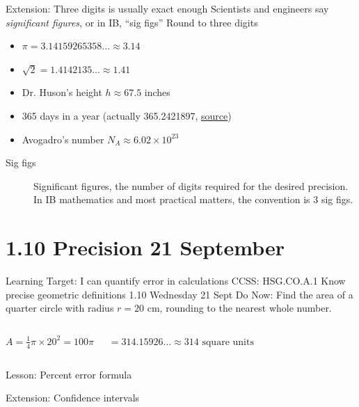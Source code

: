 \begin{frame}{Extension: Three digits is usually exact enough}
    {Scientists and engineers say \emph{significant figures}, or in IB, ``sig figs''}
    Round to three digits
    \begin{itemize}
        \item $\pi = 3.14159265358... \approx 3.14$
        \item $\sqrt{2}= 1.4142135... \approx 1.41$
        \item Dr. Huson's height $h \approx 67.5$ inches
        \item 365 days in a year (actually 365.2421897, \href{https://www.math.net/days-in-a-year}{source})
        \item Avogadro's number $N_A \approx 6.02 \times 10^{23}$
    \end{itemize} \vspace{1cm}
    \begin{description}
        \item[Sig figs] Significant figures, the number of digits required for the desired precision. In IB mathematics and most practical matters, the convention is 3 sig figs.
    \end{description}
    \end{frame}


\section{1.10 Precision \hfill 21 September}
\begin{frame}{Learning Target: I can quantify error in calculations}
    {CCSS: HSG.CO.A.1 Know precise geometric definitions \hfill \alert{1.10 Wednesday 21 Sept}}
        Do Now: Find the area of a quarter circle with radius $r=20$ cm, rounding to the nearest whole number. \par \bigskip
        \begin{columns}
            $A = \frac{1}{4} \pi \times 20^2 = 100 \pi$ \par \bigskip
            $= 314.15926... \approx 314 \text{ square units}$
        \end{columns} \vspace{1cm}
        Lesson: Percent error formula \par \medskip
        Extension: Confidence intervals
    \end{frame}  

